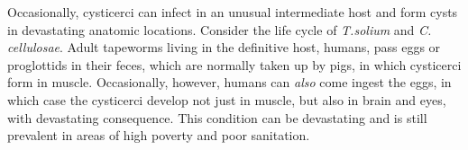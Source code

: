 \documentclass[openany]{report}
\begin{document}
Occasionally, cysticerci can infect in an unusual intermediate host and
form cysts in devastating anatomic locations. Consider the life cycle of
\emph{T.solium} and \emph{C. cellulosae}. Adult tapeworms living in the
definitive host, humans, pass eggs or proglottids in their feces, which
are normally taken up by pigs, in which cysticerci form in muscle.
Occasionally, however, humans can \emph{also} come ingest the eggs, in
which case the cysticerci develop not just in muscle, but also in brain
and eyes, with devastating consequence. This condition can be
devastating and is still prevalent in areas of high poverty and poor
sanitation.


\end{document}
